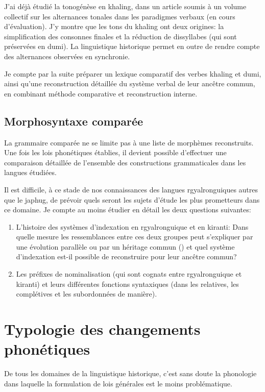 \documentclass[oldfontcommands,oneside,a4paper,11pt]{article}
\begin{document}
J'ai déjà étudié la tonogénèse en khaling, dans un article soumis à un volume collectif sur les alternances tonales dans les paradigmes verbaux (en cours d'évaluation). J'y montre que les tons du khaling ont deux origines: la simplification des consonnes finales et la réduction de dissyllabes (qui sont préservées en dumi). La linguistique historique permet en outre de rendre compte des alternances observées en synchronie.

Je compte par la suite préparer un lexique comparatif des verbes khaling et dumi, ainsi qu'une reconstruction détaillée du système verbal de leur ancêtre commun, en combinant méthode comparative et reconstruction interne.

\subsection{Morphosyntaxe comparée}
La grammaire comparée ne se limite pas à une liste de morphèmes reconstruits. Une fois les lois phonétiques établies, il devient possible d'effectuer une comparaison détaillée de l'ensemble des constructions grammaticales dans les langues étudiées.

Il est difficile, à ce stade de nos connaissances des langues rgyalronguiques autres que le japhug, de prévoir quels seront les sujets d'étude les plus prometteurs dans ce domaine. Je compte au moins étudier en détail les deux questions suivantes:
\begin{enumerate}
\item L'histoire des systèmes d'indexation en rgyalronguique et en kiranti: Dans quelle mesure les ressemblances entre ces deux groupes peut s'expliquer par une évolution parallèle ou par un héritage commun (\citealt{jacques12agreement}) et quel système d'indexation est-il possible de reconstruire pour leur ancêtre commun?
\item Les préfixes de nominalisation (qui sont cognats entre rgyalronguique et kiranti) et leurs différentes fonctions syntaxiques (dans les relatives, les complétives et les subordonnées de manière).
\end{enumerate}

 



\section{Typologie des changements phonétiques } \label{sec:phonetique}
De tous les domaines de la linguistique historique, c'est sans doute la phonologie dans laquelle la formulation de lois générales est le moins problématique. 
\end{document}
